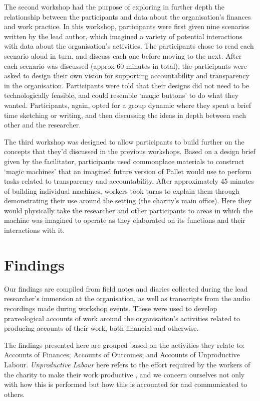 The second workshop had the purpose of exploring in further depth the relationship between the participants and data about the organisation's finances and work practice. In this workshop, participants were first given nine scenarios written by the lead author, which imagined a variety of potential interactions with data about the organisation's activities. The participants chose to read each scenario aloud in turn, and discuss each one before moving to the next. After each scenario was discussed (approx 60 minutes in total), the participants were asked to design their own vision for supporting accountability and transparency in the organisation. Participants were told that their designs did not need to be technologically feasible, and could resemble `magic buttons' to do what they wanted. Participants, again, opted for a group dynamic where they spent a brief time sketching or writing, and then discussing the ideas in depth between each other and the researcher.

The third workshop was designed to allow participants to build further on the concepts that they'd discussed in the previous workshops. Based on a design brief given by the facilitator, participants used commonplace materials to construct `magic machines' that an imagined future version of Pallet would use to perform tasks related to transparency and accountability. After approximately 45 minutes of building individual machines, workers took turns to explain them through demonstrating their use around the setting (the charity's main office). Here they would physically take the researcher and other participants to areas in which the machine was imagined to operate as they elaborated on its functions and their interactions with it.

\section{Findings}
Our findings are compiled from field notes and diaries collected during the lead researcher's immersion at the organisation, as well as transcripts from the audio recordings made during workshop events. These were used to develop praxeological accounts of work \cite{crabtree_doing_2012} around the organisaiton's activities related to producing accounts of their work, both financial and otherwise.

The findings presented here are grouped based on the activities they relate to: Accounts of Finances; Accounts of Outcomes; and Accounts of Unproductive Labour. \textit{Unproductive Labour} here refers to the effort required by the workers of the charity to make their work productive \cite{marx_contribution_1970}, and we concern ourselves not only with how this is performed but how this is accounted for and communicated to others.

